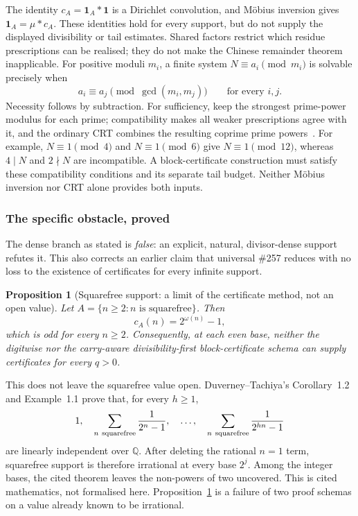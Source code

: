 \documentclass[11pt]{article}
\theoremstyle{plain}
\newtheorem{prop}[thm]{Proposition}
\theoremstyle{definition}
\theoremstyle{remark}
\newcommand{\Q}{\mathbb{Q}}
\begin{document}
The identity $c_A=\mathbf1_A*\mathbf1$ is a Dirichlet convolution,
and M\"obius inversion gives $\mathbf1_A=\mu*c_A$.  These identities
hold for every support, but do not supply the displayed divisibility
or tail estimates.  Shared factors restrict which residue prescriptions
can be realised; they do not make the Chinese remainder theorem
inapplicable.  For positive moduli $m_i$, a finite system
$N\equiv a_i\pmod{m_i}$ is solvable precisely when
\[
 a_i\equiv a_j\pmod{\gcd(m_i,m_j)}\qquad\text{for every }i,j.
\]
Necessity follows by subtraction.  For sufficiency, keep the strongest
prime-power modulus for each prime; compatibility makes all weaker
prescriptions agree with it, and the ordinary CRT combines the
resulting coprime prime powers~\cite[Theorem~3.1, pp.~2--3]{conradcrt}.
For example, $N\equiv1\pmod4$ and $N\equiv1\pmod6$ give
$N\equiv1\pmod{12}$, whereas $4\mid N$ and $2\nmid N$ are
incompatible.  A block-certificate construction must satisfy these
compatibility conditions and its separate tail budget.  Neither
M\"obius inversion nor CRT alone provides both inputs.

\subsubsection*{The specific obstacle, proved}

The dense branch as stated is \emph{false}: an explicit, natural, divisor-dense support refutes
it.  This also corrects an earlier claim that universal \#257 reduces with no loss to the
existence of certificates for every infinite support.

\begin{prop}[Squarefree support: a limit of the certificate method, not an open value]
\label{prop:squarefree}
Let $A=\{n\ge2:n\text{ is squarefree}\}$.  Then
\[
  c_{A}(n)=2^{\omega(n)}-1,
\]
which is odd for every $n\ge2$.  Consequently, at each even base, neither the
digitwise nor the carry-aware divisibility-first block-certificate schema can
supply certificates for every $q>0$.
\end{prop}

This does not leave the squarefree value open.  Duverney--Tachiya's
Corollary~1.2 and Example~1.1 prove that, for every $h\ge1$,
\[
  1,\quad
  \sum_{n\ {\rm squarefree}}\frac1{2^n-1},\quad\ldots,\quad
  \sum_{n\ {\rm squarefree}}\frac1{2^{hn}-1}
\]
are linearly independent over $\Q$.  After deleting the rational $n=1$
term, squarefree support is therefore irrational at every base $2^j$.
Among the integer bases, the cited theorem leaves the non-powers of two
uncovered.  This is cited mathematics, not formalised here.  Proposition~\ref{prop:squarefree}
is a failure of two proof schemas on a value already known to be irrational.
\end{document}
